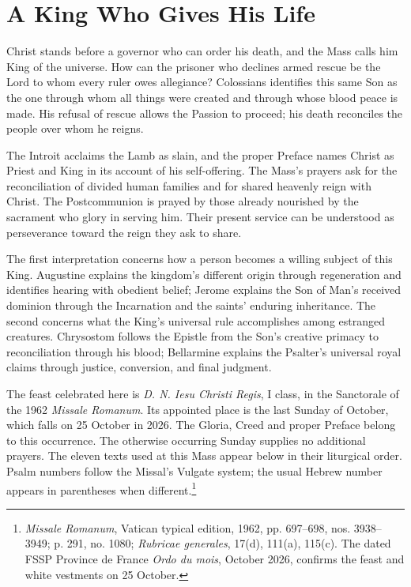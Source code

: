 \section{A King Who Gives His Life}
Christ stands before a governor who can order his death, and the Mass calls him King of the universe. How can the prisoner who declines armed rescue be the Lord to whom every ruler owes allegiance? Colossians identifies this same Son as the one through whom all things were created and through whose blood peace is made. His refusal of rescue allows the Passion to proceed; his death reconciles the people over whom he reigns.

The Introit acclaims the Lamb as slain, and the proper Preface names Christ as Priest and King in its account of his self-offering. The Mass's prayers ask for the reconciliation of divided human families and for shared heavenly reign with Christ. The Postcommunion is prayed by those already nourished by the sacrament who glory in serving him. Their present service can be understood as perseverance toward the reign they ask to share.

The first interpretation concerns how a person becomes a willing subject of this King. Augustine explains the kingdom's different origin through regeneration and identifies hearing with obedient belief; Jerome explains the Son of Man's received dominion through the Incarnation and the saints' enduring inheritance. The second concerns what the King's universal rule accomplishes among estranged creatures. Chrysostom follows the Epistle from the Son's creative primacy to reconciliation through his blood; Bellarmine explains the Psalter's universal royal claims through justice, conversion, and final judgment.

The feast celebrated here is \emph{D. N. Iesu Christi Regis}, I class, in the Sanctorale of the 1962 \emph{Missale Romanum}. Its appointed place is the last Sunday of October, which falls on 25 October in 2026. The Gloria, Creed and proper Preface belong to this occurrence. The otherwise occurring Sunday supplies no additional prayers. The eleven texts used at this Mass appear below in their liturgical order. Psalm numbers follow the Missal's Vulgate system; the usual Hebrew number appears in parentheses when different.\footnote{\emph{Missale Romanum}, Vatican typical edition, 1962, pp. 697--698, nos. 3938--3949; p. 291, no. 1080; \emph{Rubricae generales}, 17(d), 111(a), 115(c). The dated FSSP Province de France \emph{Ordo du mois}, October 2026, confirms the feast and white vestments on 25 October.}

